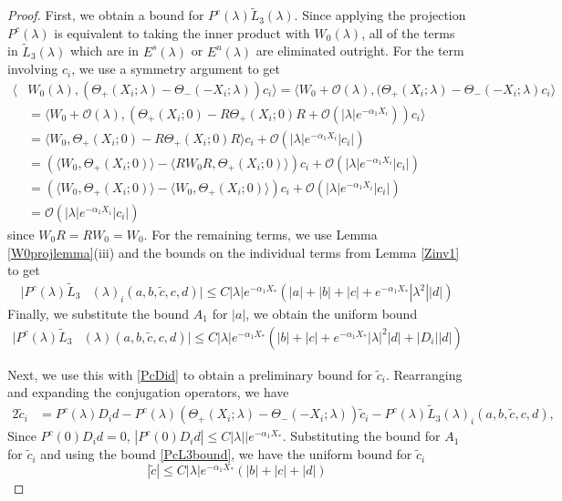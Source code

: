 \documentclass[thesis.tex]{subfiles}
\begin{document}
\begin{lemma}
\begin{proof}
First, we obtain a bound for $P^c(\lambda)\tilde{L}_3(\lambda)$. Since applying the projection $P^c(\lambda)$ is equivalent to taking the inner product with $W_0(\lambda)$, all of the terms in $\tilde{L}_3(\lambda)$ which are in $E^s(\lambda)$ or $E^u(\lambda)$ are eliminated outright. For the term involving $c_i$, we use a symmetry argument to get
\begin{align*}
\langle &W_0(\lambda), (\Theta_+(X_i; \lambda) - \Theta_-(-X_i; \lambda))c_i\rangle = \langle W_0 + \mathcal{O}(\lambda), (\Theta_+(X_i; \lambda) - \Theta_-(-X_i; \lambda) c_i \rangle \\
&= \langle W_0 + \mathcal{O}(\lambda), (\Theta_+(X_i; 0) - R \Theta_+(X_i; 0)R + \mathcal{O}(|\lambda|e^{-\alpha_1 X_i} ))c_i \rangle \\
&= \langle W_0, \Theta_+(X_i; 0) - R \Theta_+(X_i; 0)R \rangle c_i + \mathcal{O}(|\lambda|e^{-\alpha_1 X_i} |c_i|) \\
&= (\langle W_0, \Theta_+(X_i; 0) \rangle - \langle R W_0 R, \Theta_+(X_i; 0) \rangle) c_i + \mathcal{O}(|\lambda|e^{-\alpha_1 X_i} |c_i|) \\
&= (\langle W_0, \Theta_+(X_i; 0) \rangle - \langle W_0, \Theta_+(X_i; 0) \rangle) c_i + \mathcal{O}(|\lambda|e^{-\alpha_1 X_i} |c_i|) \\
&= \mathcal{O}(|\lambda|e^{-\alpha_1 X_i} |c_i|) 
\end{align*}
since $W_0 R = R W_0 = W_0$. For the remaining terms, we use Lemma \ref{W0projlemma}(iii) and the bounds on the individual terms from Lemma \ref{Zinv1} to get
\begin{align*}
|P^c(\lambda)\tilde{L}_3&(\lambda)_i(a,b,\tilde{c},c,d)| \leq C |\lambda| e^{-\alpha_1 X_*}  \left( |a| + |b| + |c| + e^{-\alpha_1 X_*} |\lambda^2| |d| \right)
\end{align*}
Finally, we substitute the bound $A_1$ for $|a|$, we obtain the uniform bound
\begin{align}\label{PcL3bound}
|P^c(\lambda)\tilde{L}_3&(\lambda)(a,b,\tilde{c},c,d)| \leq C |\lambda| e^{-\alpha_1 X_*}  \left( |b| + |c| + e^{-\alpha_1 X_*} |\lambda|^2 |d| + |D_i||d| \right)
\end{align}

Next, we use this with \cref{PcDid} to obtain a preliminary bound for $\tilde{c}_i$. Rearranging and expanding the conjugation operators, we have
\begin{align*}
2 \tilde{c}_i &=
P^c(\lambda)D_i d - P^c(\lambda) (\Theta_+(X_i; \lambda) - \Theta_-(-X_i; \lambda))\tilde{c}_i - P^c(\lambda) \tilde{L}_3(\lambda)_i(a,b,\tilde{c},c,d),
\end{align*}
Since $P^c(0)D_i d = 0$, $|P^c(0)D_i d| \leq C |\lambda||e^{-\alpha_1 X_*}$. Substituting the bound for $A_1$ for $\tilde{c}_i$ and using the bound \cref{PcL3bound}, we have the uniform bound for $\tilde{c}_i$
\begin{equation}\label{tildecbound1}
|\tilde{c}| \leq C |\lambda| e^{-\alpha_1 X_*}  \left( |b| + |c| + |d| \right)
\end{equation}


\end{proof}
\end{lemma}
\end{document}
